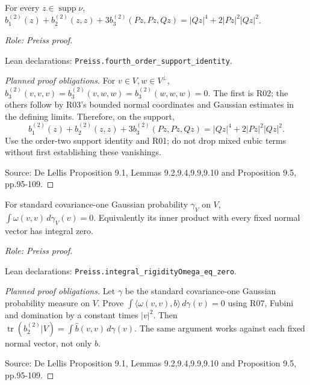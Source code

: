 \begin{lemma}
\label{lem:rigidity-fourth-support-identity}






For every $z\in\operatorname{supp}\nu$, $b_1^{(2)}(z)+b_2^{(2)}(z,z)+3b_3^{(2)}(Pz,Pz,Qz)=|Qz|^4+2|Pz|^2|Qz|^2$.
\par\emph{Role: Preiss proof.}
\par Lean declarations: \texttt{Preiss.fourth\_order\_support\_identity}.
\end{lemma}
\begin{proof}[Planned proof obligations]

For $v\in V,w\in V^\perp$,
$b_3^{(2)}(v,v,v)=b_3^{(2)}(v,w,w)=b_3^{(2)}(w,w,w)=0$.
The first is R02; the others follow by R03's bounded normal coordinates and
Gaussian estimates in the defining limits. Therefore, on the support,
\[
 b_1^{(2)}(z)+b_2^{(2)}(z,z)+3b_3^{(2)}(Pz,Pz,Qz)
 =|Qz|^4+2|Pz|^2|Qz|^2.
\]
Use the order-two support identity and R01; do not drop mixed cubic terms
without first establishing these vanishings.
\par Source: De Lellis Proposition 9.1, Lemmas 9.2,9.4,9.9,9.10 and Proposition 9.5, pp.95-109.
\end{proof}

\begin{lemma}
\label{lem:rigidity-omega-trace-zero}






For standard covariance-one Gaussian probability $\gamma_V$ on $V$, $\int\omega(v,v)\,d\gamma_V(v)=0$. Equivalently its inner product with every fixed normal vector has integral zero.
\par\emph{Role: Preiss proof.}
\par Lean declarations: \texttt{Preiss.integral\_rigidityOmega\_eq\_zero}.
\end{lemma}
\begin{proof}[Planned proof obligations]

Let $\gamma$ be the standard covariance-one Gaussian probability measure on
$V$. Prove $\int\langle\omega(v,v),b\rangle\,d\gamma(v)=0$ using R07,
Fubini and domination by a constant times $|v|^2$.
Then
$\operatorname{tr}(b_2^{(2)}|V)=\int\widehat b(v,v)\,d\gamma(v)$.
The same argument works against each fixed normal vector, not only $b$.
\par Source: De Lellis Proposition 9.1, Lemmas 9.2,9.4,9.9,9.10 and Proposition 9.5, pp.95-109.
\end{proof}

